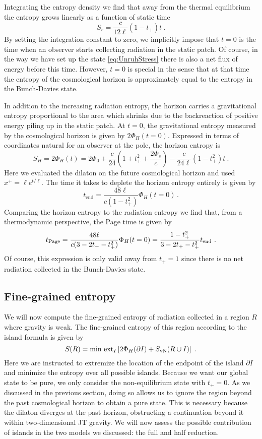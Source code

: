 \documentclass[a4paper,11pt]{article}
\newcommand{\beq}{\begin{equation}}
\newcommand{\eeq}{\end{equation}}
\numberwithin{equation}{section}
\begin{document}
Integrating the entropy density we find that away from the thermal equilibrium the entropy grows linearly as a function of static time
\beq \label{eq:radiationentropy}
S_r = \frac{c}{12\ell}(1-t_+)t ~.
\eeq
By setting the integration constant to zero, we implicitly impose that $t=0$ is the time when an observer starts collecting radiation in the static patch. Of course, in the way we have set up the state \eqref{eq:UnruhStress} there is also a net flux of energy before this time. However, $t=0$ is special in the sense that at that time the entropy of the cosmological horizon is approximately equal to the entropy in the Bunch-Davies state.

In addition to the increasing radiation entropy, the horizon carries a gravitational entropy proportional to the area which shrinks due to the backreaction of positive energy piling up in the static patch. At $t=0$, the gravitational entropy measured by the cosmological horizon is given by $2\Phi_{H}(t=0)$. Expressed in terms of coordinates natural for an observer at the pole, the horizon entropy is
\beq \label{eq:HorizonEntropyThermo}
S_H = 2\Phi_H(t) = 2\Phi_0+\frac c{24}\left(1+t_+^2+\frac{2\Phi_s}{c}\right) - \frac{c}{24\ell}(1-t_+^2)t~.
\eeq
Here we evaluated the dilaton on the future cosmological horizon and used $x^+=\ell e^{t/\ell}$. The time it takes to deplete the horizon entropy entirely is given by
\begin{equation}
    t_{\text{end}}
    =
    \frac{48\ell}{c(1-t_{+}^{2})}
    \Phi_H(t=0)
    \,.
\end{equation}
Comparing the horizon entropy to the radiation entropy we find that, from a thermodynamic perspective, the Page time is given by
\beq\label{eq:page_time_thermo}
t_{\rm Page} = \frac{48\ell}{c(3-2t_+-t_+^2)}\Phi_H(t=0) 
=
    \frac{
        1-t_{+}^{2}
    }{
        3-2t_{+}-t^{2}_{+}
    }
    t_{\text{end}}
~.
\eeq
Of course, this expression is only valid away from $t_+=1$ since there is no net radiation collected in the Bunch-Davies state.


\subsection{Fine-grained entropy}
%
We will now compute the fine-grained entropy of radiation collected in a region $R$ where gravity is weak. The fine-grained entropy of this region according to the island formula is given by
\beq
S(R) = \text{min ext}_I\left[2\Phi_H(\partial I) + S_{\rm vN}(R\cup I)\right] ~.
\eeq
Here we are instructed to extremize the location of the endpoint of the island $\partial I$ and minimize the entropy over all possible islands. Because we want our global state to be pure, we only consider the non-equilibrium state with $t_+=0$. As we discussed in the previous section, doing so allows us to ignore the region beyond the past cosmological horizon to obtain a pure state. This is necessary because the dilaton diverges at the past horizon, obstructing a continuation beyond it within two-dimensional JT gravity. We will now assess the possible contribution of islands in the two models we discussed: the full and half reduction.
\end{document}
